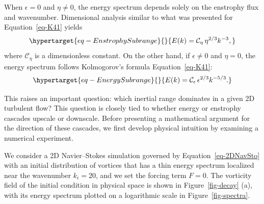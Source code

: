 \documentclass[
  letterpaper,
  twocolumn,
  landscape]{report}
\begin{document}
When \(\epsilon = 0\) and \(\eta \neq 0\), the energy spectrum depends
solely on the enstrophy flux and wavenumber. Dimensional analysis
similar to what was presented for Equation~\ref{eq-K41} yields
\begin{equation}\protect\hypertarget{eq-EnstrophySubrange}{}{ 
E(k) = \mathcal{C}_{\eta} \, \eta^{2/3} k^{-3},
}\label{eq-EnstrophySubrange}\end{equation} where \(\mathcal{C}_{\eta}\)
is a dimensionless constant. On the other hand, if \(\epsilon \neq 0\)
and \(\eta = 0\), the energy spectrum follows Kolmogorov's formula
Equation~\ref{eq-K41}:
\begin{equation}\protect\hypertarget{eq-EnergySubrange}{}{
E(k) = \mathcal{C}_{\epsilon} \, \epsilon^{2/3} k^{-5/3}.
}\label{eq-EnergySubrange}\end{equation}

This raises an important question: which inertial range dominates in a
given 2D turbulent flow? This question is closely tied to whether energy
or enstrophy cascades upscale or downscale. Before presenting a
mathematical argument for the direction of these cascades, we first
develop physical intuition by examining a numerical experiment.

We consider a 2D Navier--Stokes simulation governed by
Equation~\ref{eq-2DNavSto} with an initial distribution of vortices that
has a thin energy spectrum localized near the wavenumber \(k_i = 20\),
and we set the forcing term \(F=0\). The vorticity field of the initial
condition in physical space is shown in Figure~\ref{fig-decay} (a), with
its energy spectrum plotted on a logarithmic scale in
Figure~\ref{fig-spectra}.
\end{document}

